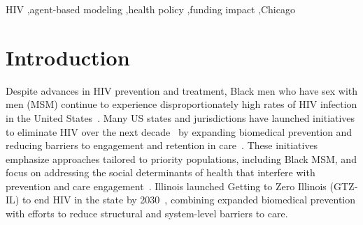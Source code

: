 \documentclass[preprint,12pt]{elsarticle}
\begin{document}
\begin{frontmatter}

\begin{keyword}
HIV \sep agent-based modeling \sep health policy \sep funding impact \sep Chicago


\end{keyword}

\end{frontmatter}




\newpage
\section{Introduction}
\label{sec:intro}

Despite advances in HIV prevention and treatment, Black men who have sex with men (MSM) continue to experience disproportionately high rates of HIV infection in the United States~\cite{mayer_persistent_2021, sullivan_epidemiology_2021, beyrer_call_2021}. Many US states and jurisdictions have launched initiatives to eliminate HIV over the next decade~\cite{sullivan_epidemiology_2021, beyrer_call_2021} by expanding biomedical prevention and reducing barriers to engagement and retention in care~\cite{grant_uptake_2014, Fed_HIV_stats, CDCPrEP2022}. These initiatives emphasize approaches tailored to priority populations, including Black MSM, and focus on addressing the social determinants of health that interfere with prevention and care engagement~\cite{mayer_persistent_2021, schneider_at_2017, sullivan_epidemiology_2021}. Illinois launched Getting to Zero Illinois (GTZ-IL) to end HIV in the state by 2030~\cite{chicago_getting_to_zero, chicago_gtz_2.0}, combining expanded biomedical prevention with efforts to reduce structural and system-level barriers to care.
\end{document}
